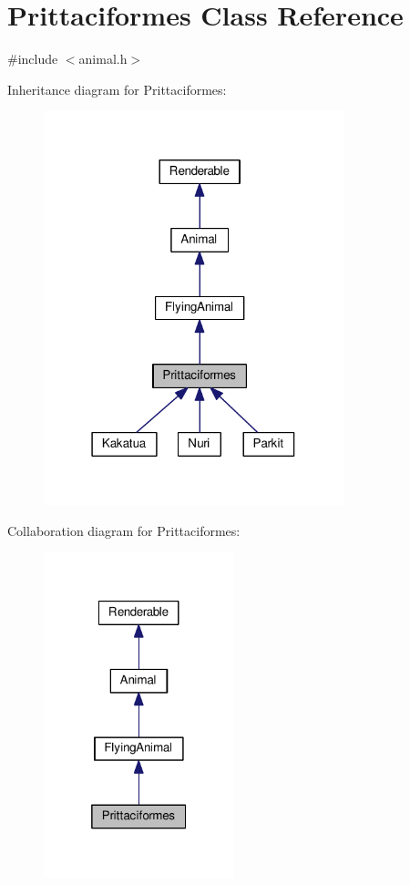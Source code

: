 \hypertarget{classPrittaciformes}{}\section{Prittaciformes Class Reference}
\label{classPrittaciformes}


{\ttfamily \#include $<$animal.\+h$>$}



Inheritance diagram for Prittaciformes\+:
\nopagebreak
\begin{figure}[H]
\begin{center}
\leavevmode
\includegraphics[width=247pt]{classPrittaciformes__inherit__graph}
\end{center}
\end{figure}


Collaboration diagram for Prittaciformes\+:
\nopagebreak
\begin{figure}[H]
\begin{center}
\leavevmode
\includegraphics[width=157pt]{classPrittaciformes__coll__graph}
\end{center}
\end{figure}

